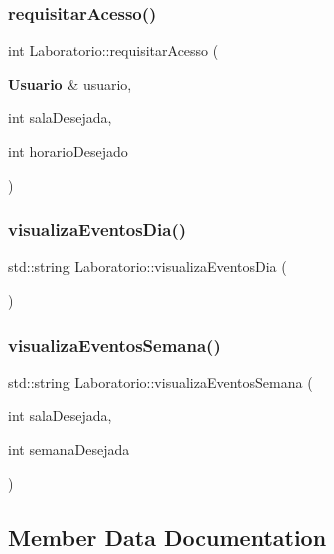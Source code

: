 \subsubsection{requisitar\+Acesso()}
{\footnotesize\ttfamily int Laboratorio\+::requisitar\+Acesso (\begin{DoxyParamCaption}\item[{\textbf{ Usuario} \&}]{usuario,  }\item[{int}]{sala\+Desejada,  }\item[{int}]{horario\+Desejado }\end{DoxyParamCaption})\hspace{0.3cm}{\ttfamily [inline]}}

\mbox{\label{class_laboratorio_a033ac23a2ee75a64023c886064ac7bb9}} 
\subsubsection{visualiza\+Eventos\+Dia()}
{\footnotesize\ttfamily std\+::string Laboratorio\+::visualiza\+Eventos\+Dia (\begin{DoxyParamCaption}{ }\end{DoxyParamCaption})\hspace{0.3cm}{\ttfamily [inline]}}

\mbox{\label{class_laboratorio_ae97e2238bce38c7419be25ecccb36c85}} 
\subsubsection{visualiza\+Eventos\+Semana()}
{\footnotesize\ttfamily std\+::string Laboratorio\+::visualiza\+Eventos\+Semana (\begin{DoxyParamCaption}\item[{int}]{sala\+Desejada,  }\item[{int}]{semana\+Desejada }\end{DoxyParamCaption})\hspace{0.3cm}{\ttfamily [inline]}}



\subsection{Member Data Documentation}
\mbox{\label{class_laboratorio_a27717414cd527b1e94cd302e802e33ac}} 
